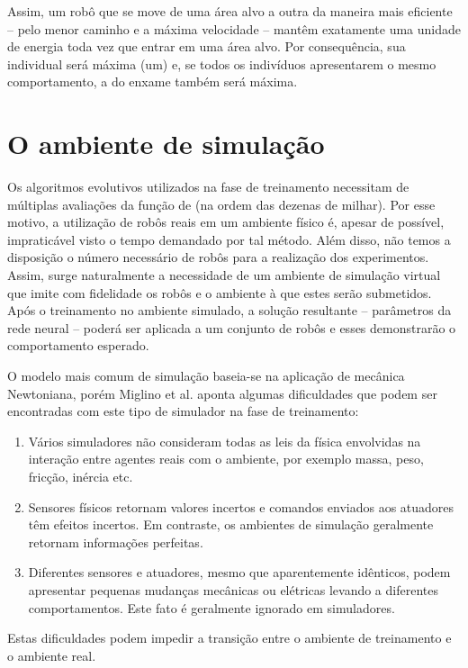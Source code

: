 Assim, um robô que se move de uma área alvo a outra da maneira mais eficiente -- pelo menor caminho e a máxima velocidade -- mantêm exatamente uma unidade de energia toda vez que entrar em uma área alvo. Por consequência, sua \fitness individual será máxima (um) e, se todos os indivíduos apresentarem o mesmo comportamento, a \fitness do enxame também será máxima.

\section{O ambiente de simulação}
\label{sec:simulation}

Os algoritmos evolutivos utilizados na fase de treinamento necessitam de múltiplas avaliações da função de \fitness (na ordem das dezenas de milhar). Por esse motivo, a utilização de robôs reais em um ambiente físico é, apesar de possível, impraticável visto o tempo demandado por tal método. Além disso, não temos a disposição o número necessário de robôs para a realização dos experimentos. Assim, surge naturalmente a necessidade de um ambiente de simulação virtual que imite com fidelidade os robôs e o ambiente à que estes serão submetidos. Após o treinamento no ambiente simulado, a solução resultante -- parâmetros da rede neural -- poderá ser aplicada a um conjunto de robôs e esses demonstrarão o comportamento esperado.

O modelo mais comum de simulação baseia-se na aplicação de mecânica Newtoniana, porém Miglino et al. \cite{miglino1996evolving} aponta algumas dificuldades que podem ser encontradas com este tipo de simulador na fase de treinamento:
\begin{enumerate}
    \item Vários simuladores não consideram todas as leis da física envolvidas na interação entre agentes reais com o ambiente, por exemplo massa, peso, fricção, inércia etc.
    \item Sensores físicos retornam valores incertos e comandos enviados aos atuadores têm efeitos incertos. Em contraste, os ambientes de simulação geralmente retornam informações perfeitas.
    \item Diferentes sensores e atuadores, mesmo que aparentemente idênticos, podem apresentar pequenas mudanças mecânicas ou elétricas levando a diferentes comportamentos. Este fato é geralmente ignorado em simuladores.
\end{enumerate}

Estas dificuldades podem impedir a transição entre o ambiente de treinamento e o ambiente real.

